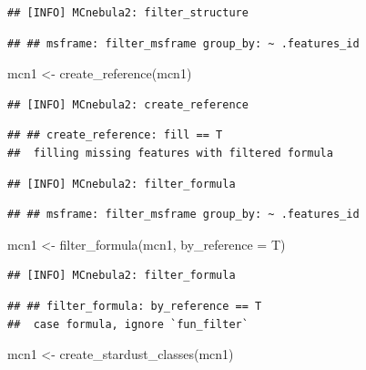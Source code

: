 \documentclass[
]{article}
\newenvironment{Shaded}{\begin{snugshade}}{\end{snugshade}}
\newcommand{\AttributeTok}[1]{\textcolor[rgb]{0.77,0.63,0.00}{#1}}
\newcommand{\FunctionTok}[1]{\textcolor[rgb]{0.00,0.00,0.00}{#1}}
\newcommand{\NormalTok}[1]{#1}
\newcommand{\OtherTok}[1]{\textcolor[rgb]{0.56,0.35,0.01}{#1}}
\begin{document}
\begin{verbatim}
## [INFO] MCnebula2: filter_structure
\end{verbatim}

\begin{verbatim}
## ## msframe: filter_msframe group_by: ~ .features_id
\end{verbatim}

\begin{Shaded}
\begin{Highlighting}[]
\NormalTok{mcn1 }\OtherTok{\textless{}{-}} \FunctionTok{create\_reference}\NormalTok{(mcn1)}
\end{Highlighting}
\end{Shaded}

\begin{verbatim}
## [INFO] MCnebula2: create_reference
\end{verbatim}

\begin{verbatim}
## ## create_reference: fill == T 
##  filling missing features with filtered formula
\end{verbatim}

\begin{verbatim}
## [INFO] MCnebula2: filter_formula
\end{verbatim}

\begin{verbatim}
## ## msframe: filter_msframe group_by: ~ .features_id
\end{verbatim}

\begin{Shaded}
\begin{Highlighting}[]
\NormalTok{mcn1 }\OtherTok{\textless{}{-}} \FunctionTok{filter\_formula}\NormalTok{(mcn1, }\AttributeTok{by\_reference =}\NormalTok{ T)}
\end{Highlighting}
\end{Shaded}

\begin{verbatim}
## [INFO] MCnebula2: filter_formula
\end{verbatim}

\begin{verbatim}
## ## filter_formula: by_reference == T 
##  case formula, ignore `fun_filter`
\end{verbatim}

\begin{Shaded}
\begin{Highlighting}[]
\NormalTok{mcn1 }\OtherTok{\textless{}{-}} \FunctionTok{create\_stardust\_classes}\NormalTok{(mcn1)}
\end{Highlighting}
\end{Shaded}
\end{document}
